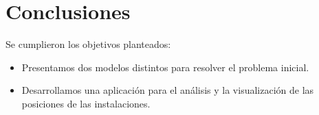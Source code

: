 \section{Conclusiones}

Se cumplieron los objetivos planteados:

\begin{itemize}[label=\textbullet]
    \item Presentamos dos modelos distintos para resolver el problema inicial.
    \item Desarrollamos una aplicación para el análisis y la visualización de las posiciones de las instalaciones.
\end{itemize}